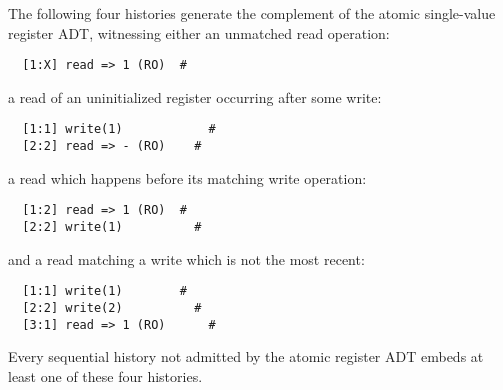 \begin{example}
  \label{ex:patterns}

  The following four histories generate the complement of the atomic
  single-value register ADT, witnessing either an unmatched read operation:
\begin{verbatim}
  [1:X] read => 1 (RO)  #
\end{verbatim}
  a read of an uninitialized register occurring after some write:
\begin{verbatim}
  [1:1] write(1)            #
  [2:2] read => - (RO)    #
\end{verbatim}
  a read which happens before its matching write operation:
\begin{verbatim}
  [1:2] read => 1 (RO)  #
  [2:2] write(1)          #
\end{verbatim}
  and a read matching a write which is not the most recent:
\begin{verbatim}
  [1:1] write(1)        #
  [2:2] write(2)          #
  [3:1] read => 1 (RO)      #
\end{verbatim}
  Every sequential history not admitted by the atomic register ADT embeds at
  least one of these four histories.
  
\end{example}
